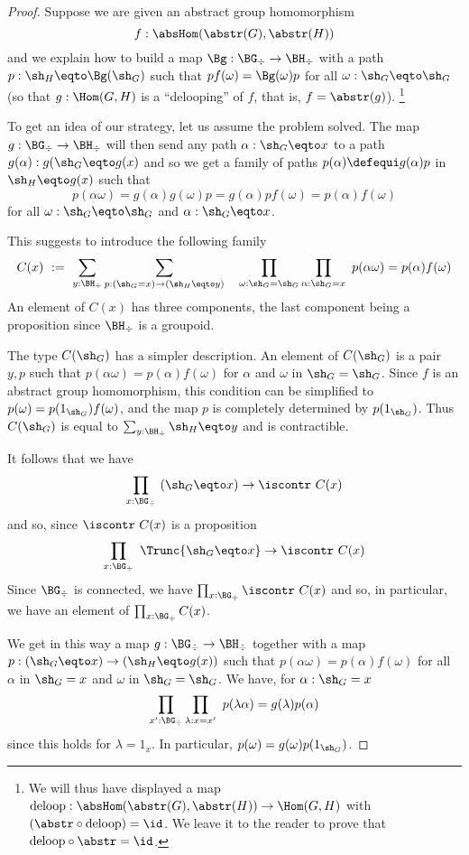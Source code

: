 \begin{proof}
  Suppose we are given an abstract group homomorphism
$$f:\absHom(\abstr(G),\abstr(H))$$
and we explain how to build a map $\Bg:\BG_\div \rightarrow \BH_\div$ with
a path $p:\sh_H \eqto \Bg(\sh_G)$ such that $p f(\omega) = \Bg(\omega) p$
for all $\omega:\sh_G \eqto \sh_G$ (so that $g:\Hom(G,H)$ is a ``delooping'' of $f$, 
that is, $f=\abstr(g)$).%
\footnote{We will thus have displayed a map
$\mathrm{deloop}:\absHom(\abstr(G),\abstr(H))\to\Hom(G,H)$ with 
$({\abstr}\circ\mathrm{deloop})=\id$. We leave it to the reader 
to prove that $\mathrm{deloop}\circ{\abstr}=\id$. }

To get an idea of our strategy, let us assume the problem solved. The map $g:\BG_\div\rightarrow \BH_\div$
will then send any path $\alpha:\sh_G \eqto x$ to a path $g(\alpha):g(\sh_G \eqto g(x)$
and so we get a family of paths $p(\alpha) \defequi g(\alpha) p$ in ${\sh_H} \eqto g(x)$ such that
$$p(\alpha\omega) = g(\alpha)g(\omega)p
  = g(\alpha)pf(\omega) = p(\alpha)f(\omega)$$
for all $\omega:\sh_G \eqto \sh_G$ and $\alpha : \sh_G \eqto x$.

This suggests to introduce the following family
$$
C(x)~:=~ \sum_{y:\BH_\div}\sum_{p:({\sh_G}=x)\rightarrow (\sh_H \eqto y)}~~~\prod_{\omega:{\sh_G}={\sh_G}}\prod_{\alpha:{\sh_G}=x}~
 p(\alpha\omega) = p(\alpha)f(\omega)
$$
 An element of $C(x)$ has three components, the last component being
 a proposition since $\BH_\div$ is a groupoid.

 The type $C({\sh_G})$ has a simpler description. An element of $C({\sh_G})$ is
 a pair $y,p$ such that $p(\alpha\omega) = p(\alpha)f(\omega)$ for
 $\alpha$ and $\omega$ in ${\sh_G}={\sh_G}$.
 Since $f$ is an abstract group homomorphism, this condition
 can be simplified to $p(\omega) = p(1_{\sh_G})f(\omega)$, and the map $p$
 is completely determined by $p(1_{\sh_G})$.
 Thus $C({\sh_G})$ is equal to $\sum_{y:\BH_\div}\sh_H \eqto y$ and is contractible.


 It follows that we have
 $$
 \prod_{x:\BG_\div}~ (\sh_G \eqto x)\rightarrow\iscontr~ C(x)
 $$
and so, since $\iscontr~C(x)$ is a proposition
 $$
 \prod_{x:\BG_\div}~ \Trunc{\sh_G \eqto x}\rightarrow\iscontr~ C(x)
 $$
 Since $\BG_\div$ is connected, we have
 $\prod_{x:\BG_\div}\iscontr~ C(x)$
 and so, in particular, we have an element of $\prod_{x:\BG_\div}C(x)$.

 We get in this way a map $g:\BG_\div\rightarrow \BH_\div$
 together with a map $p:({\sh_G}\eqto x)\rightarrow ({\sh_H} \eqto g(x))$ such that
 $p (\alpha\omega) = p(\alpha) f(\omega)$
 for all $\alpha$ in ${\sh_G}=x$ and $\omega$ in ${\sh_G}={\sh_G}$.
We have, for $\alpha:{\sh_G}=x$
$$\prod_{x':\BG_\div}\prod_{\lambda:x=x'}~p(\lambda\alpha) = g(\lambda)p(\alpha)$$
since this holds for $\lambda = 1_x$.
In particular, $p(\omega) = g(\omega)p(1_{\sh_G})$.


\end{proof}
